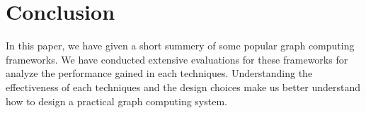 \section{Conclusion} \label{con}
In this paper, we have given a short summery of some popular graph computing
frameworks. We have conducted extensive evaluations for these frameworks
for analyze the performance gained in each techniques. Understanding
the effectiveness of each techniques and the design choices
make us better understand how to design a practical graph computing system.

